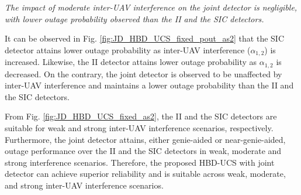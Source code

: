 



\begin{observation}
\emph{\emph{The impact of moderate inter-UAV interference on the joint detector is negligible, with lower outage probability observed than the II and the SIC detectors.}
}\end{observation}

It can be observed in Fig. \ref{fig:JD_HBD_UCS_fixed_pout_as2} that the SIC detector attains lower outage probability as inter-UAV interference ($\alpha_{1,2}$) is increased. Likewise, the II detector attains lower outage probability as $\alpha_{1,2}$ is decreased. On the contrary, the joint detector is observed to be unaffected by inter-UAV interference and maintains a lower outage probability than the II and the SIC detectors.

From Fig. \ref{fig:JD_HBD_UCS_fixed_as2}, the II and the SIC detectors are suitable for weak and strong inter-UAV interference scenarios, respectively. Furthermore, the joint detector attains, either genie-aided or near-genie-aided, outage performance over the II and the SIC detectors in weak, moderate and strong interference scenarios. Therefore, the proposed HBD-UCS with joint detector can achieve superior reliability and is suitable across weak, moderate, and strong inter-UAV interference scenarios.

